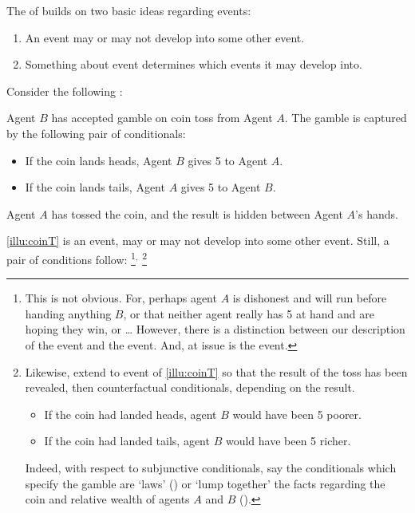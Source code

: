 \begin{note}
  The \itc{} of \qWhyV{} builds on two basic ideas regarding events:
  \begin{enumerate}
  \item
    An event may or may not develop into some other event.
  \item
    Something about event determines which events it may develop into.
  \end{enumerate}

  Consider the following :

  \begin{scenario}%
    \label{illu:coinT}%
    Agent \(B\) has accepted gamble on coin toss from Agent \(A\).
    The gamble is captured by the following pair of conditionals:
    \begin{itemize}[noitemsep]
    \item
      If the coin lands heads, Agent \(B\) gives \texteuro{}5 to Agent \(A\).
    \item
      If the coin lands tails, Agent \(A\) gives \texteuro{}5 to Agent \(B\).
    \end{itemize}
    Agent \(A\) has tossed the coin, and the result is hidden between Agent \(A\)'s hands.
  \end{scenario}

  \noindent%
  \autoref{illu:coinT} is an event, may or may not develop into some other event.
  Still, a pair of conditions follow:%
  \footnote{
    \label{fn:desc-con-caveat}
    This is not obvious.
    For, perhaps agent \(A\) is dishonest and will run before handing anything \(B\), or that neither agent really has \texteuro{}5 at hand and are hoping they win, or \dots
    However, there is a distinction between our description of the event and the event.
    And, at issue is the event.
  }\(^{,}\)%
  \footnote{
    \nocite{Tichy:1976tp}%
    Likewise, extend to event of \autoref{illu:coinT} so that the result of the toss has been revealed, then counterfactual conditionals, depending on the result.

    \begin{itemize}[noitemsep]
    \item
      If the coin had landed heads, agent \(B\) would have been \texteuro{}5 poorer.
    \item
      If the coin had landed tails, agent \(B\) would have been \texteuro{}5 richer.
    \end{itemize}

    Indeed, with respect to subjunctive conditionals, say the conditionals which specify the gamble are `laws' (\cite{Chisholm:1955aa,Lewis:1979vm,Veltman:2005tj}) or `lump together' the facts regarding the coin and relative wealth of agents \(A\) and \(B\) (\cite{Kratzer:1981aa,Kratzer:1989aa}).
  }


\end{note}

